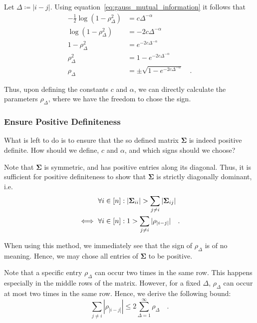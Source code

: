 \documentclass[../../main.tex]{subfiles}
\begin{document}
Let $\Delta \coloneqq |i-j|$. Using equation~\eqref{eq:gauss_mutual_information} it follows that
\begin{align*}
    -\frac{1}{2}\log(1-\rho_\Delta^2) &= c \Delta^{-\alpha} \\
    \log(1-\rho_\Delta^2) &= -2c \Delta^{-\alpha} \\
    1-\rho_\Delta^2 &= e^{-2c \Delta^{-\alpha}} \\
    \rho_\Delta^2 &= 1 - e^{-2c \Delta^{-\alpha}} \\
    \rho_\Delta &= \pm \sqrt{1 - e^{-2c \Delta^{-\alpha}}} \quad .
\end{align*}

Thus, upon defining the constants $c$ and $\alpha$, we can directly calculate the parameters $\rho_\Delta$, where we have the freedom to chose the sign.

\subsubsection{Ensure Positive Definiteness}
What is left to do is to ensure that the so defined matrix $\bm{\Sigma}$ is indeed positive definite. How should we define, $c$ and $\alpha$, and which signs should we choose?

Note that $\bm{\Sigma}$ is symmetric, and has positive entries along its diagonal. Thus, it is sufficient for positive definiteness to show that $\bm{\Sigma}$ is strictly diagonally dominant, i.e.
\begin{align}
    &\forall i \in [n]: |\bm{\Sigma}_{ii}| > \sum_{j \neq i} |\bm{\Sigma}_{ij}| \notag \\
    \iff \ &\forall i \in [n]: 1 > \sum_{j \neq i} |\rho_{|i-j|}| \quad .
\end{align}

When using this method, we immediately see that the sign of $\rho_\Delta$ is of no meaning. Hence, we may chose all entries of $\bm{\Sigma}$ to be positive.

Note that a specific entry $\rho_\Delta$ can occur two times in the same row. This happens especially in the middle rows of the matrix. However, for a fixed $\Delta$, $\rho_\Delta$ can occur at most two times in the same row. Hence, we derive the following bound:
\[
    \sum_{j \neq i} |\rho_{|i-j|}| \leq 2 \sum_{\Delta = 1}^{\infty} \rho_\Delta \quad .
\]
\end{document}
